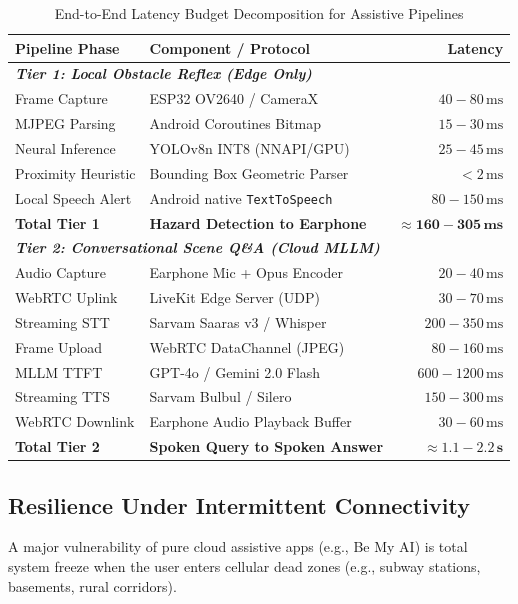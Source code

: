 \documentclass[10pt,twocolumn]{article}
\begin{document}
\begin{table}[t]
\centering
\small
\caption{End-to-End Latency Budget Decomposition for Assistive Pipelines}
\label{tab:latency}
\begin{tabularx}{\columnwidth}{l X r}
\toprule
\textbf{Pipeline Phase} & \textbf{Component / Protocol} & \textbf{Latency} \\
\midrule
\multicolumn{3}{l}{\textit{\textbf{Tier 1: Local Obstacle Reflex (Edge Only)}}} \\
Frame Capture & ESP32 OV2640 / CameraX & $40 - 80\,\text{ms}$ \\
MJPEG Parsing & Android Coroutines Bitmap & $15 - 30\,\text{ms}$ \\
Neural Inference & YOLOv8n INT8 (NNAPI/GPU) & $25 - 45\,\text{ms}$ \\
Proximity Heuristic & Bounding Box Geometric Parser & $<2\,\text{ms}$ \\
Local Speech Alert & Android native \texttt{TextToSpeech} & $80 - 150\,\text{ms}$ \\
\textbf{Total Tier 1} & \textbf{Hazard Detection to Earphone} & \textbf{$\approx \mathbf{160 - 305\,\text{ms}}$} \\
\midrule
\multicolumn{3}{l}{\textit{\textbf{Tier 2: Conversational Scene Q\&A (Cloud MLLM)}}} \\
Audio Capture & Earphone Mic + Opus Encoder & $20 - 40\,\text{ms}$ \\
WebRTC Uplink & LiveKit Edge Server (UDP) & $30 - 70\,\text{ms}$ \\
Streaming STT & Sarvam Saaras v3 / Whisper & $200 - 350\,\text{ms}$ \\
Frame Upload & WebRTC DataChannel (JPEG) & $80 - 160\,\text{ms}$ \\
MLLM TTFT & GPT-4o / Gemini 2.0 Flash & $600 - 1200\,\text{ms}$ \\
Streaming TTS & Sarvam Bulbul / Silero & $150 - 300\,\text{ms}$ \\
WebRTC Downlink & Earphone Audio Playback Buffer & $30 - 60\,\text{ms}$ \\
\textbf{Total Tier 2} & \textbf{Spoken Query to Spoken Answer} & \textbf{$\approx \mathbf{1.1 - 2.2\,\text{s}}$} \\
\bottomrule
\end{tabularx}
\end{table}

\subsection{Resilience Under Intermittent Connectivity}
A major vulnerability of pure cloud assistive apps (e.g., Be My AI) is total system freeze when the user enters cellular dead zones (e.g., subway stations, basements, rural corridors). 
\end{document}
